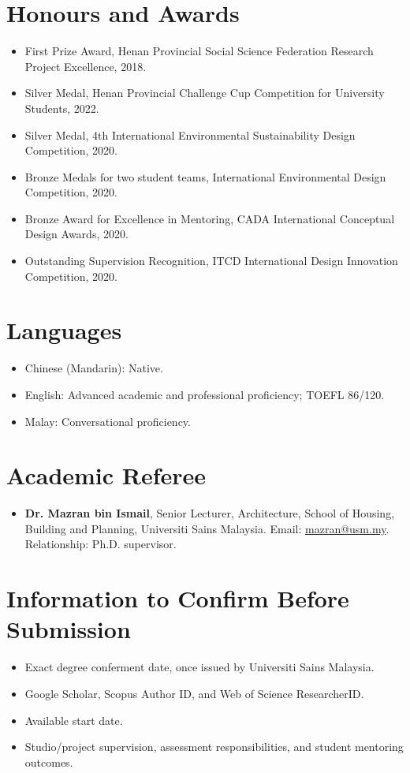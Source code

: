 \documentclass[11pt,a4paper]{article}
\begin{document}
\section*{Honours and Awards}
\begin{itemize}
  \item First Prize Award, Henan Provincial Social Science Federation Research Project Excellence, 2018.
  \item Silver Medal, Henan Provincial Challenge Cup Competition for University Students, 2022.
  \item Silver Medal, 4th International Environmental Sustainability Design Competition, 2020.
  \item Bronze Medals for two student teams, International Environmental Design Competition, 2020.
  \item Bronze Award for Excellence in Mentoring, CADA International Conceptual Design Awards, 2020.
  \item Outstanding Supervision Recognition, ITCD International Design Innovation Competition, 2020.
\end{itemize}

\section*{Languages}
\begin{itemize}
  \item Chinese (Mandarin): Native.
  \item English: Advanced academic and professional proficiency; TOEFL 86/120.
  \item Malay: Conversational proficiency.
\end{itemize}

\section*{Academic Referee}
\begin{itemize}
  \item \textbf{Dr. Mazran bin Ismail}, Senior Lecturer, Architecture, School of Housing, Building and Planning, Universiti Sains Malaysia. Email: \href{mailto:mazran@usm.my}{mazran@usm.my}. Relationship: Ph.D. supervisor.
\end{itemize}

\section*{Information to Confirm Before Submission}
\begin{itemize}
  \item Exact degree conferment date, once issued by Universiti Sains Malaysia.
  \item Google Scholar, Scopus Author ID, and Web of Science ResearcherID.
  \item Available start date.
  \item Studio/project supervision, assessment responsibilities, and student mentoring outcomes.
\end{itemize}
\end{document}
